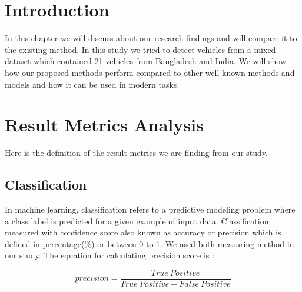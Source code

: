 
\section{Introduction}

In this chapter we will discuss about our research findings and will compare it to the existing method. In this study we tried to detect vehicles from a mixed dataset which contained 21 vehicles from Bangladesh and India. We will show how our proposed methods perform compared to other well known methods and models and how it can be used in modern tasks.

\section{Result Metrics Analysis}
Here is the definition of the result metrics we are finding from our study.
\subsection{Classification} 
In machine learning, classification refers to a predictive modeling problem where a class label is predicted for a given example of input data. 
Classification measured with confidence score  also known as accuracy or precision which is defined in percentage(\%) or between 0 to 1. We used both measuring method in our study. The equation for calculating precision score is :

\begin{equation}
    precision = \frac{True \ Positive}{True \ Positive+False \ Positive}
\end{equation}

